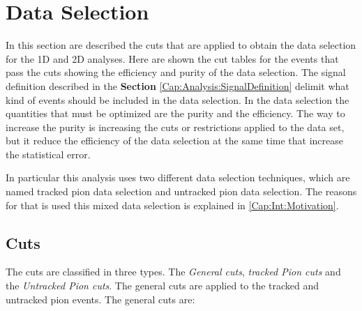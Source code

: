 \section{Data Selection}
\label{Cap:Analysis:DataSelection}

In this section are described the cuts that are applied to obtain the data selection for the 1D and 2D analyses. Here are shown the cut tables for the events that pass the cuts showing the efficiency and purity of the data selection. The signal definition described in the \textbf{Section} \ref{Cap:Analysis:SignalDefinition} delimit what kind of events should be included in the data selection. In the data selection the quantities that must be optimized are the purity and the efficiency. The way to increase the purity is increasing the cuts or restrictions applied to the data set, but it reduce the efficiency of the data selection at the same time that increase the statistical error. 

In particular this analysis uses two different data selection techniques, which are named tracked pion data selection and untracked pion data selection. The reasons for that is used this mixed data selection is explained in \ref{Cap:Int:Motivation}.


\subsection{Cuts}
\label{Cap:Analysis:DataSelection:Cuts}

The cuts are classified in three types. The \textit{General cuts}, \textit{tracked Pion cuts} and the \textit{Untracked Pion cuts}. The general cuts are applied to the tracked and untracked pion events. The general cuts are:

